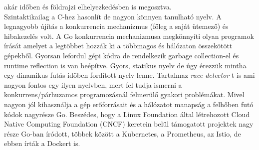 akár időben és földrajzi elhelyezkedésben is megosztva.\\
Szintaktikailag a C-hez hasonlít de nagyon könnyen tanulható nyelv.
A legnagyobb újítás a konkurrencia mechanizmus (főleg a saját ütemező) és hibakezelés volt.
A Go konkurrencia mechanizmusa megkönnyíti olyan programok írását amelyet a legtöbbet hozzák ki a többmagos és hálózaton összekötött gépekből.
Gyorsan lefordul gépi kódra de rendelkezik garbage collection-el és runtime reflection is van beépítve.
Gyors, statikus nyelv de úgy érezzük mintha egy dinamikus futás időben fordított nyelv lenne.
Tartalmaz \textit{race detector}-t is ami nagyon fontos egy ilyen nyelvben, mert fel tudja ismerni a konkurrens/párhuzamos programozásnál felmerülő gyakori problémákat.
Mivel nagyon jól kihasználja a gép erőforrásait és a hálózatot manapság a felhőben futó kódok nagyrésze Go.
Beszédes, hogy a Linux Foundation által létrehozott Cloud Native Computing Foundation (CNCF) keretein
belül támogatott projektek nagy része Go-ban íródott, többek között a Kubernetes, a Prometheus, az Istio, de ebben írták a Dockert is.\\


